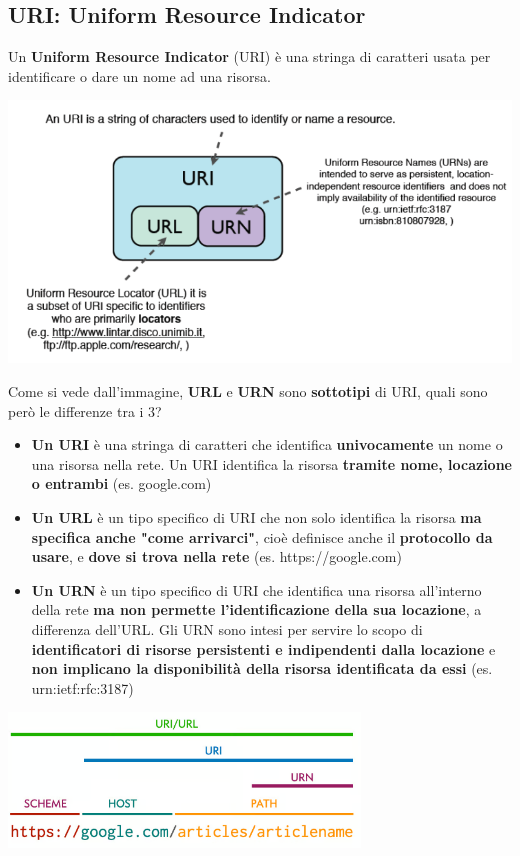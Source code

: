 \documentclass[12pt]{article}
\begin{document}
\subsection{URI: Uniform Resource Indicator}
Un \textbf{Uniform Resource Indicator} (URI) è una stringa di caratteri usata per identificare o dare un nome ad una risorsa.
\begin{center}
    \includegraphics[width = 1\textwidth]{Images/115.PNG}
\end{center}
Come si vede dall'immagine, \textbf{URL} e \textbf{URN} sono \textbf{sottotipi} di URI, quali sono però le differenze tra i 3?
\begin{itemize}
    \item \textbf{Un URI} è una stringa di caratteri che identifica \textbf{univocamente} un nome o una risorsa nella rete. Un URI identifica la risorsa \textbf{tramite nome, locazione o entrambi} (es. google.com)
    \item \textbf{Un URL} è un tipo specifico di URI che non solo identifica la risorsa \textbf{ma specifica anche "come arrivarci"}, cioè definisce anche il \textbf{protocollo da usare}, e \textbf{dove si trova nella rete} (es. https://google.com)
    \item \textbf{Un URN} è un tipo specifico di URI che identifica una risorsa all'interno della rete \textbf{ma non permette l'identificazione della sua locazione}, a differenza dell'URL. Gli URN sono intesi per servire lo scopo di \textbf{identificatori di risorse persistenti e indipendenti dalla locazione} e \textbf{non implicano la disponibilità della risorsa identificata da essi} (es. urn:ietf:rfc:3187)
\end{itemize}
\begin{center}
    \includegraphics[width = 0.70\textwidth]{Images/116.PNG}
\end{center}
\end{document}
